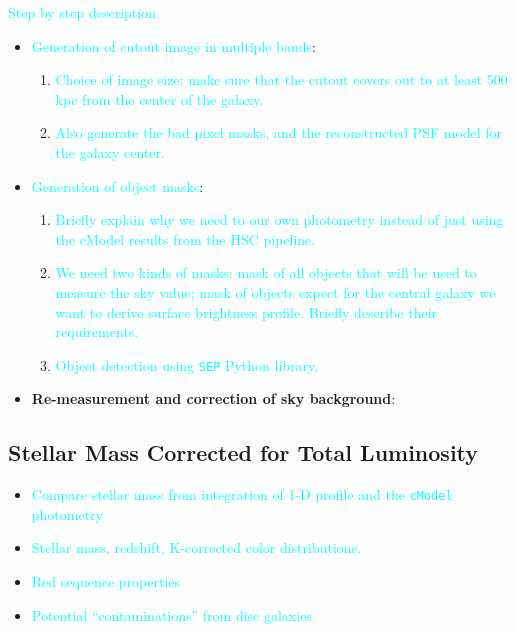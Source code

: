 \documentclass[preprint]{aastex}
\newcommand{\plan}[1]{\textcolor{cyan}{#1}}
\begin{document}
\begin{CJK*}{UTF8}{gbsn}
    \plan{Step by step description}
    \begin{itemize}
        \item \plan{Generation of cutout image in multiple bands}: \\
            \begin{enumerate}
                \item \plan{Choice of image size: make sure that the cutout covers out 
                    to at least 500 kpc from the center of the galaxy.}
                \item \plan{Also generate the bad pixel masks, and the reconstructed 
                    PSF model for the galaxy center.}
            \end{enumerate}
        \item \plan{Generation of object masks}: \\
            \begin{enumerate}
                \item \plan{Briefly explain why we need to our own photometry instead 
                    of just using the cModel results from the HSC pipeline.}
                \item \plan{We need two kinds of masks: mask of all objects that will 
                    be used to measure the sky value; mask of objects expect for the 
                    central galaxy we want to derive surface brightness profile.  
                    Briefly describe their requirements.}
                \item \plan{Object detection using \texttt{SEP} Python library.}
            \end{enumerate}
        \item \textbf{Re-measurement and correction of sky background}:
    \end{itemize}
    
\subsection{Stellar Mass Corrected for Total Luminosity}

    \begin{itemize}
        \item \plan{Compare stellar mass from integration of 1-D profile and the 
            \texttt{cModel} photometry}
        \item \plan{Stellar mass, redshift, K-corrected color distributions.}
        \item \plan{Red sequence properties}    
        \item \plan{Potential ``contaminations'' from disc galaxies}
    \end{itemize}
    

\end{CJK*}
\end{document}
